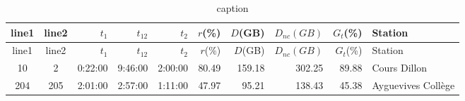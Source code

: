 \documentclass[twoside,12pt]{article}
\begin{document}
    \begin{longtable}{|c|c|r|r|r|r|r|r|r|l|}
        \caption{caption}
        \label{table:label}  \\ %

        \hline
        line1   &   line2   &   $t_1$       &   $t_{12}$    &   $t_2$       &   $r$(\%)&    $D$(GB)&    $D_{nc}(GB)$&$G_t$(\%)&Station\\
        \hline
        \endfirsthead

        \hline
        line1   &   line2   &   $t_1$       &   $t_{12}$    &   $t_2$       &   $r$(\%)&    $D$(GB)&    $D_{nc}(GB)$&$G_t$(\%)&Station\\
        \hline
        \endhead

        \hline
        \endfoot

        10  &   2       &   0:22:00 &   9:46:00 &   2:00:00 &   80.49   &   159.18  &   302.25  &   89.88   &   Cours Dillon    \\
        204 &   205 &   2:01:00 &   2:57:00 &   1:11:00 &   47.97   &   95.21   &   138.43  &   45.38   &   Ayguevives Collège  \\
        \hline
    \end{longtable}

    
\end{document}
